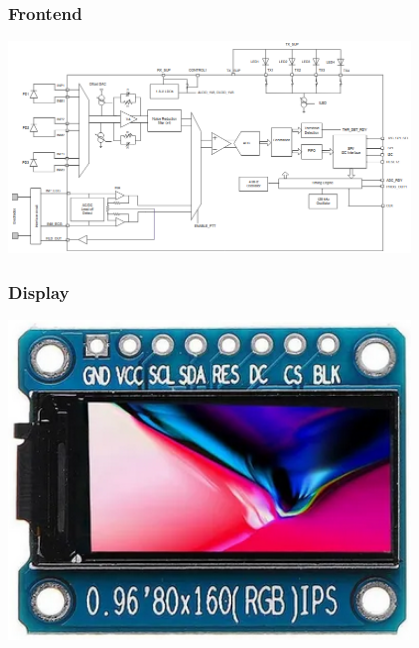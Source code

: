 \documentclass[spanish]{beamer}
\begin{document}
\begin{frame}
    \frametitle{Frontend}
    \centering
    \includegraphics[width=0.8\textwidth]{img/frontend.png}
\end{frame}

\begin{frame}
    \frametitle{Display}
    \centering
    \includegraphics[width=0.8\textwidth]{img/display.png}
\end{frame}
\end{document}

